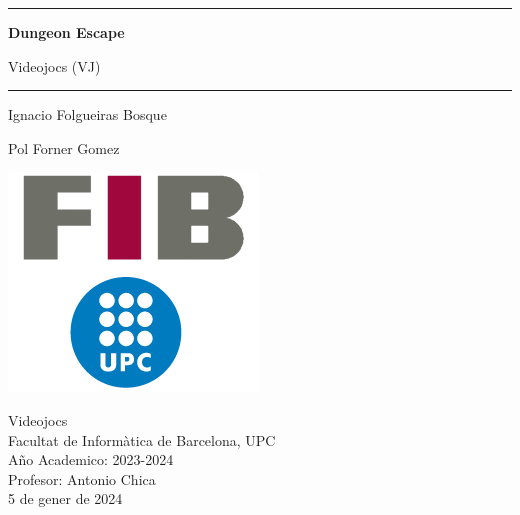 \documentclass{article}
\begin{document}
\begin{titlepage}
    \centering

    \vspace*{1cm}

    \rule{\textwidth}{1pt}

    \vspace{.7\baselineskip}
    {\huge \textbf{Dungeon Escape}}

    \vspace*{.5cm}
    {\LARGE Videojocs (VJ)}
    
    \rule{\textwidth}{1pt}

    \vspace{1cm}

    \large

    \begin{minipage}{.5\textwidth}
        \centering
        Ignacio Folgueiras Bosque \\
    \end{minipage}%
    \begin{minipage}{.5\textwidth}
        \centering
        Pol Forner Gomez \\
    \end{minipage}


    \vspace{2cm}

    \includegraphics[width=.7\textwidth]{img/fib-upc-v2-transparent.png}

    \vfill

    Videojocs \\
    Facultat de Informàtica de Barcelona, UPC\\
    Año Academico: 2023-2024 \\
    Profesor: Antonio Chica \\
    5 de gener de 2024
\end{titlepage}
\end{document}
